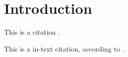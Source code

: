 \section{Introduction}\label{sec:intro}

\lipsum[2-5]

This is a citation \parencite{teixeira2021}.

This is a in-text citation, according to \textcite{teixeira2020}.
